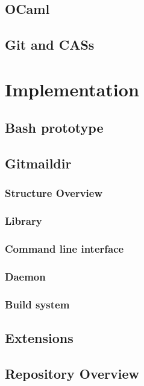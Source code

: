 \documentclass[12pt,a4paper,twoside,openright]{report}
\begin{document}
\section{OCaml}

\section{Git and CASs}

\chapter{Implementation}

\section{Bash prototype}

\section{Gitmaildir}

\subsection{Structure Overview}

\subsection{Library}

\subsection{Command line interface}

\subsection{Daemon}

\subsection{Build system}

\section{Extensions}

\section{Repository Overview}
\end{document}
